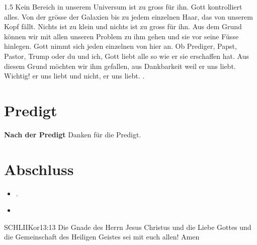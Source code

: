 \documentclass[fontsize=14pt]{../../inc/mybib}
\begin{document}
\begin{spacing}{1.5}
    Kein Bereich in unserem Universum ist zu gross für ihn. Gott kontrolliert alles. Von der grösse der Galaxien bis zu jedem einzelnen Haar, das von unserem Kopf fällt. Nichts ist zu klein und nichts ist zu gross für ihn. Aus dem Grund können wir mit allen unseren Problem zu ihm gehen und sie vor seine Füsse hinlegen. Gott nimmt sich jeden einzelnen von hier an. Ob Prediger, Papst, Pastor, Trump oder du und ich, Gott liebt alle so wie er sie erschaffen hat. Aus diesem Grund möchten wir ihm gefallen, aus Dankbarkeit weil er uns liebt. Wichtig!  er uns liebt und nicht,  er uns liebt.
    .
\end{spacing}
\section{Predigt}
\textbf{Nach der Predigt}\newline
Danken für die Predigt.
\section{Abschluss}
\begin{itemize}
    \item [] .
    \item [] 
\end{itemize}
\begin{bibelbox}{SCHL}{IIKor}{13:13}
    Die Gnade des Herrn Jesus Christus und die Liebe Gottes und die Gemeinschaft des Heiligen Geistes sei mit euch allen! Amen
\end{bibelbox}
\end{document}
